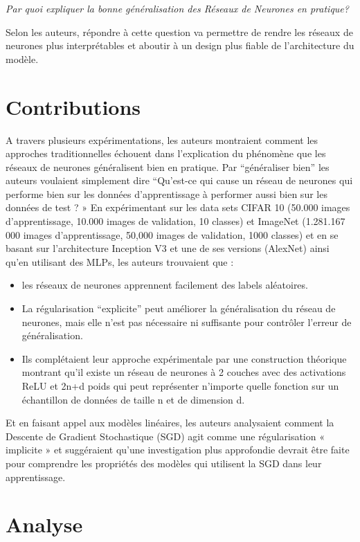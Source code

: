 \documentclass[a4paper,english,12pt, twocolumn]{article}
\begin{document}
\textit{Par quoi expliquer la bonne généralisation des Réseaux de Neurones en pratique? }

Selon les auteurs, répondre à cette question va permettre de rendre les réseaux de neurones plus interprétables et aboutir à un design plus fiable de l’architecture du modèle. 

\section{Contributions}
A travers plusieurs expérimentations, les auteurs montraient comment les approches traditionnelles échouent dans l’explication du phénomène que les réseaux de neurones généralisent bien en pratique. Par “généraliser bien” les auteurs voulaient simplement dire “Qu’est-ce qui cause un réseau de neurones qui performe bien sur les données d’apprentissage à performer aussi bien sur les données de test ? » 
En expérimentant sur les data sets CIFAR 10 (50.000 images d’apprentissage, 10.000 images de validation, 10 classes) et ImageNet (1.281.167 000 images d’apprentissage, 50,000 images de validation, 1000 classes) et en se basant sur l’architecture Inception V3 et une de ses versions (AlexNet) ainsi qu'en utilisant des MLPs, les auteurs trouvaient que :
\begin{itemize}
	\item les réseaux de neurones apprennent facilement des labels aléatoires. 
	\item La régularisation “explicite” peut améliorer la généralisation du réseau de neurones, mais elle n’est pas nécessaire ni suffisante pour contrôler l’erreur de généralisation. 
	\item Ils complétaient leur approche expérimentale par une construction théorique montrant qu'il existe un réseau de neurones à 2 couches avec des activations ReLU et 2n+d poids qui peut représenter n’importe quelle fonction sur un échantillon de données de taille n et de dimension d. 
\end{itemize}

Et en faisant appel aux modèles linéaires, les auteurs analysaient comment la Descente de Gradient Stochastique (SGD) agit comme une régularisation « implicite » et suggéraient qu’une investigation plus approfondie devrait être faite pour comprendre les propriétés des modèles qui utilisent la SGD dans leur apprentissage.

\vspace{-2em}

\section{Analyse}
\vspace{-1em}
\end{document}
